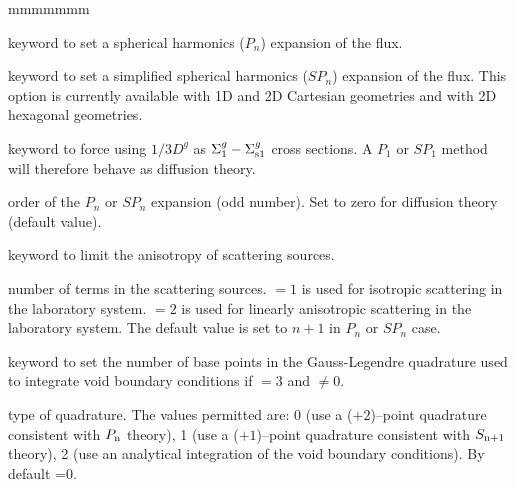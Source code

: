 \begin{ListeDeDescription}{mmmmmmm}
\item[\moc{PN}] keyword to set a spherical harmonics ($P_n$) expansion of the flux.\cite{nse2005}

\item[\moc{SPN}] keyword to set a simplified spherical harmonics ($SP_n$) expansion
of the flux.\cite{nse2005,ane10a} This option is currently available with 1D and 2D Cartesian geometries
and with 2D hexagonal geometries.

\item[\moc{DIFF}] keyword to force using $1/3D^{g}$ as $\Sigma_1^{g}-\Sigma_{{\rm s}1}^{g}$ cross sections. A $P_1$ or $SP_1$ method
will therefore behave as diffusion theory.

\item[\dusa{nlf}] order of the $P_n$ or $SP_n$ expansion (odd number). Set to zero for diffusion theory (default value).

\item[\moc{SCAT}] keyword to limit the anisotropy of scattering sources.

\item[\dusa{iscat}] number of terms in the scattering sources.  $=1$ is used for
isotropic scattering in the laboratory system.  $=2$ is used for
linearly anisotropic scattering in the laboratory system. The default value is set to $n+1$
in $P_n$ or $SP_n$ case.

\item[\moc{VOID}] keyword to set the number of base points in the Gauss-Legendre quadrature used to integrate
void boundary conditions if  $=3$ and  $\ne 0$.

\item[\dusa{nvd}] type of quadrature. The values
permitted are: 0 (use a ($+2$)--point quadrature consistent with $P_{{\rm n}}$ theory),
1 (use a ($+1$)--point quadrature consistent with $S_{{\rm n}+1}$ theory),
2 (use an analytical integration of the void boundary conditions). By default =0.

\end{ListeDeDescription}


